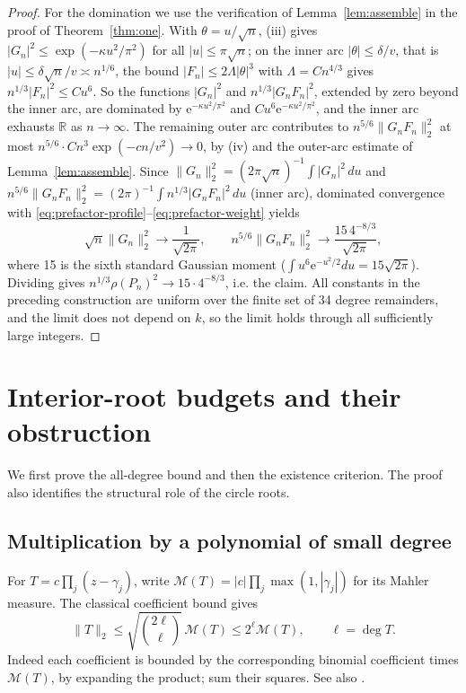 \documentclass[11pt]{article}
\theoremstyle{remark}\newtheorem{remark}[theorem]{Remark}
\newcommand{\norm}[1]{\lVert #1\rVert}
\newcommand{\ee}{\mathrm e}
\begin{document}
\begin{proof}
For the domination we use the verification of
Lemma~\ref{lem:assemble} in the proof of Theorem~\ref{thm:one}.
With \(\theta=u/\sqrt n\), (iii) gives
\(|G_n|^2\le\exp(-\kappa u^2/\pi^2)\) for all \(|u|\le\pi\sqrt n\); on the inner arc
\(|\theta|\le\delta/v\), that is \(|u|\le\delta\sqrt n/v\asymp n^{1/6}\), the
bound \(|F_n|\le2\Lambda|\theta|^3\) with \(\Lambda=Cn^{4/3}\) gives
\(n^{1/3}|F_n|^2\le C u^6\). So the functions
\(|G_n|^2\) and \(n^{1/3}|G_nF_n|^2\), extended by zero beyond the inner arc,
are dominated by \(\ee^{-\kappa u^2/\pi^2}\) and \(Cu^6\ee^{-\kappa u^2/\pi^2}\), and the
inner arc exhausts \(\mathbb R\) as \(n\to\infty\). The remaining outer arc
contributes to \(n^{5/6}\norm{G_nF_n}_2^2\) at most
\(n^{5/6}\cdot Cn^{3}\exp(-cn/v^2)\to0\), by (iv) and the outer-arc estimate of
Lemma~\ref{lem:assemble}. Since
\(\norm{G_n}_2^2=(2\pi\sqrt n)^{-1}\int|G_n|^2\,du\) and
\(n^{5/6}\norm{G_nF_n}_2^2=(2\pi)^{-1}\int n^{1/3}|G_nF_n|^2\,du\) (inner arc),
dominated convergence with \eqref{eq:prefactor-profile}--\eqref{eq:prefactor-weight} yields
\[
 \sqrt n\norm{G_n}_2^2\longrightarrow\frac1{\sqrt{2\pi}},
 \qquad
 n^{5/6}\norm{G_nF_n}_2^2\longrightarrow
       \frac{15\,4^{-8/3}}{\sqrt{2\pi}},
\]
where 15 is the sixth standard Gaussian moment
(\(\int u^6\ee^{-u^2/2}du=15\sqrt{2\pi}\)).
Dividing gives \(n^{1/3}\rho(P_n)^2\to15\cdot4^{-8/3}\), i.e. the claim.
All constants in the preceding construction
are uniform over the finite set of 34 degree remainders, and the limit does
not depend on \(k\), so the limit holds through all sufficiently large
integers.
\end{proof}

\section{Interior-root budgets and their obstruction}\label{sec:count}
We first prove the all-degree bound and then the existence criterion.
The proof also identifies the structural role of the circle roots.

\subsection{Multiplication by a polynomial of small degree}
For \(T=c\prod_j(z-\gamma_j)\), write
\(\mathcal M(T)=|c|\prod_j\max(1,|\gamma_j|)\) for its Mahler measure.
The classical coefficient bound gives
\begin{equation}\label{eq:mahlercoef}
 \norm T_2\le\sqrt{\binom{2\ell}{\ell}}\,\mathcal M(T)
            \le2^\ell\mathcal M(T),\qquad \ell=\deg T.
\end{equation}
Indeed each coefficient is bounded by the corresponding binomial
coefficient times \(\mathcal M(T)\), by expanding the product;
sum their squares. See also \cite[Lemma 1.6 and Exercise 1.11]{brunault}.
\end{document}
